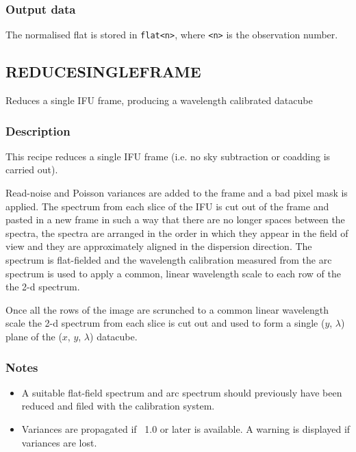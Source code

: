 \documentclass[twoside,11pt]{article}
\newcommand{\xref}[3]{#1}
\renewcommand{\_}{\texttt{\symbol{95}}}
\newcommand{\KAPPA}{\xref{{\sc{Kappa}}}{sun95}{}}
\begin{document}
\subsubsection*{Output data}

The normalised flat is stored in {\tt flat\_<n>}, where {\tt <n>} is
the observation number.

\clearpage

\subsection{REDUCE\_SINGLE\_FRAME}



Reduces a single IFU frame, producing a wavelength calibrated datacube

\subsubsection*{Description}

This recipe reduces a single IFU frame (i.e. no sky subtraction or
coadding is carried out).



Read-noise and Poisson variances are added to the frame and a bad
pixel mask is applied. The spectrum from each slice of the IFU is cut
out of the frame and pasted in a new frame in such a way that there
are no longer spaces between the spectra, the spectra are arranged in
the order in which they appear in the field of view and they are
approximately aligned in the dispersion direction. The spectrum is
flat-fielded and the wavelength calibration measured from the arc
spectrum is used to apply a common, linear wavelength scale to each
row of the the 2-d spectrum.



Once all the rows of the image are scrunched to a common linear wavelength
scale the 2-d spectrum from each slice is cut out and used to form
a single ($y$, $\lambda$) plane of the ($x$, $y$, $\lambda$) datacube.

\subsubsection*{Notes}

\begin{itemize}
\item

  A suitable flat-field spectrum and arc spectrum should previously
  have been reduced and filed with the calibration system.

\item

Variances are propagated if \KAPPA\ 1.0 or later is available. A warning
is displayed if variances are lost.
\end{itemize}
\end{document}

